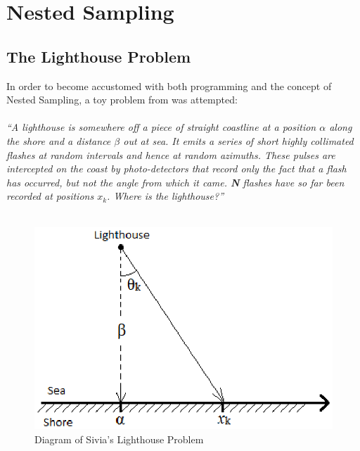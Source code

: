 \documentclass[a4paper,12pt]{article}
\begin{document}

\newpage

\section{Nested Sampling}
\subsection{The Lighthouse Problem}
In order to become accustomed with both programming and the concept of Nested Sampling, a toy problem from \cite{sivia} was attempted: \\ \\
\textit{``A lighthouse is somewhere off a piece of straight coastline at a position $\alpha$ along the shore and a distance $\beta$ out at sea. It emits a series of short highly collimated flashes at random intervals and hence at random azimuths. These pulses are intercepted on the coast by photo-detectors that record only the fact that a flash has occurred, but not the angle from which it came. \textbf{N} flashes have so far been recorded at positions $x_{k}$. Where is the lighthouse?''} \cite{sivia}
\\ \\



\begin{figure}[!h]
 \begin{center}
  \includegraphics[scale=0.75]{lighthouse.eps}
  \caption{Diagram of Sivia's Lighthouse Problem \cite{sivia}}
 \end{center}
\end{figure}
\end{document}

